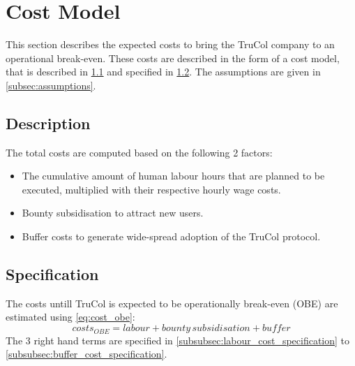 \section{Cost Model}\label{sec:cost_model}
This section describes the expected costs to bring the TruCol company to an operational break-even. These costs are described in the form of a cost model, that is described in \cref{subsec:model_description} and specified in \cref{subsec:specification}. The assumptions are given in \cref{subsec:assumptions}.

\subsection{Description}\label{subsec:model_description}
The total costs are computed based on the following 2 factors:
\begin{itemize}
	\item The cumulative amount of human labour hours that are planned to be executed, multiplied with their respective hourly wage costs.
	\item Bounty subsidisation to attract new users.
	\item Buffer costs to generate wide-spread adoption of the TruCol protocol.
\end{itemize}


\subsection{Specification}\label{subsec:specification}
The costs untill TruCol is expected to be operationally break-even (OBE) are estimated using \cref{eq:cost_obe}:
\begin{equation}
	costs_{OBE}=labour+{bounty\, subsidisation}+buffer
	\label{eq:cost_obe}
\end{equation}
The 3 right hand terms are specified in \cref{subsubsec:labour_cost_specification} to \cref{subsubsec:buffer_cost_specification}.

